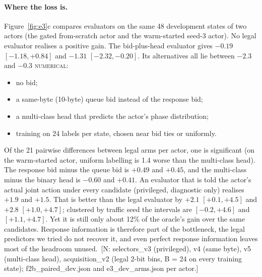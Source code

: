 \documentclass[11pt]{article}
\theoremstyle{definition}
\newcommand{\NUM}{\textsc{numerical}}
\newif\ifshownotes\shownotestrue
\newcommand{\NOTE}[1]{\ifshownotes{\color{notecol}\,\textsf{\footnotesize[N: #1]}}\fi}
\begin{document}
\paragraph{Where the loss is.} Figure~\ref{fig:e3}c compares evaluators on the same 48 development
states of two actors (the gated from-scratch actor and the warm-started seed-3 actor). No legal
evaluator realises a positive gain. The bid-plus-head evaluator gives $-0.19$ $[-1.18,+0.84]$ and
$-1.31$ $[-2.32,-0.20]$. Its alternatives all lie between $-2.3$ and $-0.3$ \NUM:
\begin{itemize}
\item no bid;
\item a same-byte (10-byte) queue bid instead of the response bid;
\item a multi-class head that predicts the actor's phase distribution;
\item training on 24 labels per state, chosen near bid ties or uniformly.
\end{itemize}
Of the 21 pairwise differences between legal arms per actor, one is significant (on the warm-started
actor, uniform labelling is 1.4 worse than the multi-class head). The response bid minus the queue bid
is $+0.49$ and $+0.45$, and the multi-class minus the binary head is $-0.60$ and $+0.41$. An evaluator that is
told the actor's actual joint action under every candidate (privileged, diagnostic only) realises
$+1.9$ and $+1.5$. That is better than the legal evaluator by $+2.1$ $[+0.1,+4.5]$ and $+2.8$
$[+1.0,+4.7]$; clustered by traffic seed the intervals are $[-0.2,+4.6]$ and $[+1.1,+4.7]$. Yet it is
still only about 12\% of the oracle's gain over the same candidates. Response information is therefore
part of the bottleneck, the legal predictors we tried do not recover it, and even perfect response
information leaves most of the headroom unused.
\NOTE{selectors\_v3 (privileged), v4 (same byte), v5 (multi-class head), acquisition\_v2 (legal
2-bit bins, B = 24 on every training state); f2b\_paired\_dev.json and e3\_dev\_arms.json per actor.}
\end{document}
